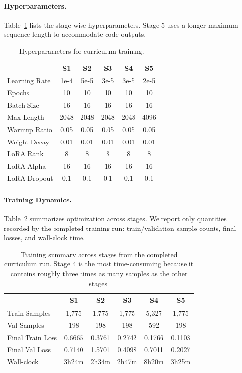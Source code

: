 \documentclass[journal]{IEEEtran}
\begin{document}
\paragraph{Hyperparameters.}
Table~\ref{tab:hyperparams} lists the stage-wise hyperparameters.
Stage 5 uses a longer maximum sequence length to accommodate code outputs.

\begin{table}[!t]
\centering
\small
\begin{tabular}{lccccc}
\toprule
& \textbf{S1} & \textbf{S2} & \textbf{S3} & \textbf{S4} & \textbf{S5} \\
\midrule
Learning Rate & 1e-4 & 5e-5 & 3e-5 & 3e-5 & 2e-5 \\
Epochs & 10 & 10 & 10 & 10 & 10 \\
Batch Size & 16 & 16 & 16 & 16 & 16 \\
Max Length & 2048 & 2048 & 2048 & 2048 & 4096 \\
Warmup Ratio & 0.05 & 0.05 & 0.05 & 0.05 & 0.05 \\
Weight Decay & 0.01 & 0.01 & 0.01 & 0.01 & 0.01 \\
LoRA Rank & 8 & 8 & 8 & 8 & 8 \\
LoRA Alpha & 16 & 16 & 16 & 16 & 16 \\
LoRA Dropout & 0.1 & 0.1 & 0.1 & 0.1 & 0.1 \\
\bottomrule
\end{tabular}
\vspace{4pt}
\caption{Hyperparameters for curriculum training.}
\label{tab:hyperparams}
\end{table}

\paragraph{Training Dynamics.}
Table~\ref{tab:training_dynamics} summarizes optimization across stages.
We report only quantities recorded by the completed training run: train/validation sample counts, final losses, and wall-clock time.

\begin{table}[!t]
\centering
\small
\begin{tabular}{lccccc}
\toprule
& \textbf{S1} & \textbf{S2} & \textbf{S3} & \textbf{S4} & \textbf{S5} \\
\midrule
Train Samples & 1,775 & 1,775 & 1,775 & 5,327 & 1,775 \\
Val Samples & 198 & 198 & 198 & 592 & 198 \\
Final Train Loss & 0.6665 & 0.3761 & 0.2742 & 0.1766 & 0.1103 \\
Final Val Loss & 0.7140 & 1.5701 & 0.4098 & 0.7011 & 0.2027 \\
Wall-clock & 3h24m & 2h34m & 2h47m & 8h20m & 3h25m \\
\bottomrule
\end{tabular}
\vspace{4pt}
\caption{Training summary across stages from the completed curriculum run. Stage 4 is the most time-consuming because it contains roughly three times as many samples as the other stages.}
\label{tab:training_dynamics}
\end{table}
\end{document}

